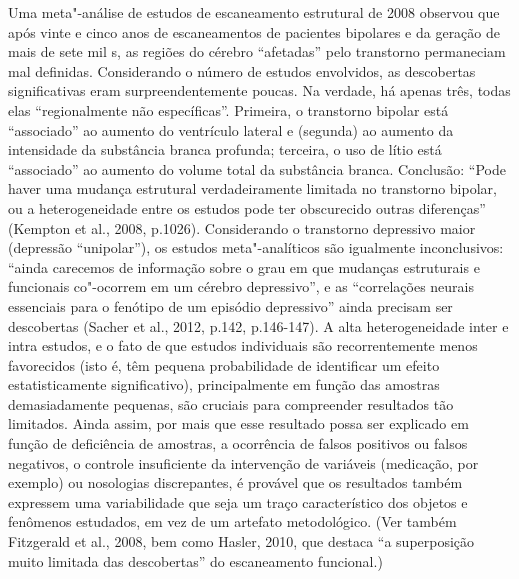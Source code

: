 Uma meta"-análise de estudos de escaneamento estrutural de 2008 observou
que após vinte e cinco anos de escaneamentos de pacientes bipolares e da
geração de mais de sete mil s, as regiões do cérebro ``afetadas''
pelo transtorno permaneciam mal definidas. Considerando o número de
estudos envolvidos, as descobertas significativas eram
surpreendentemente poucas. Na verdade, há apenas três, todas elas
``regionalmente não específicas''. Primeira, o transtorno bipolar está
``associado'' ao aumento do ventrículo lateral e (segunda) ao aumento da
intensidade da substância branca profunda; terceira, o uso de lítio está
``associado'' ao aumento do volume total da substância branca.
Conclusão: ``Pode haver uma mudança estrutural verdadeiramente limitada
no transtorno bipolar, ou a heterogeneidade entre os estudos pode ter
obscurecido outras diferenças'' (Kempton et al., 2008, p.1026).
Considerando o transtorno depressivo maior (depressão ``unipolar''), os
estudos meta"-analíticos são igualmente inconclusivos: ``ainda carecemos
de informação sobre o grau em que mudanças estruturais e funcionais
co"-ocorrem em um cérebro depressivo'', e as ``correlações neurais
essenciais para o fenótipo de um episódio depressivo'' ainda precisam
ser descobertas (Sacher et al., 2012, p.142, p.146-147). A alta
heterogeneidade inter e intra estudos, e o fato de que estudos
individuais são recorrentemente menos favorecidos (isto é, têm pequena
probabilidade de identificar um efeito estatisticamente significativo),
principalmente em função das amostras demasiadamente pequenas, são
cruciais para compreender resultados tão limitados. Ainda assim, por
mais que esse resultado possa ser explicado em função de deficiência de
amostras, a ocorrência de falsos positivos ou falsos negativos, o
controle insuficiente da intervenção de variáveis (medicação, por
exemplo) ou nosologias discrepantes, é provável que os resultados também
expressem uma variabilidade que seja um traço característico dos objetos
e fenômenos estudados, em vez de um artefato metodológico. (Ver também
Fitzgerald et al., 2008, bem como Hasler, 2010, que destaca ``a
superposição muito limitada das descobertas'' do escaneamento
funcional.)

